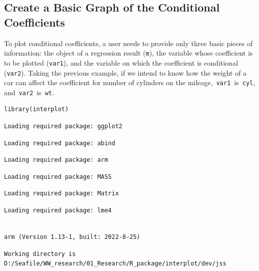 \documentclass[
  article]{jss}
\begin{document}
\hypertarget{create-a-basic-graph-of-the-conditional-coefficients}{%
\subsection{Create a Basic Graph of the Conditional
Coefficients}\label{create-a-basic-graph-of-the-conditional-coefficients}}

To plot conditional coefficients, a user needs to provide only three
basic pieces of information: the object of a regression result
(\texttt{m}), the variable whose coefficient is to be plotted
(\texttt{var1}), and the variable on which the coefficient is
conditional (\texttt{var2}). Taking the previous example, if we intend
to know how the weight of a car can affect the coefficient for number of
cylinders on the mileage,~\texttt{var1}~is~\texttt{cyl},
and~\texttt{var2}~is~\texttt{wt}.

\begin{verbatim}
library(interplot)
\end{verbatim}

\begin{verbatim}
Loading required package: ggplot2
\end{verbatim}

\begin{verbatim}
Loading required package: abind
\end{verbatim}

\begin{verbatim}
Loading required package: arm
\end{verbatim}

\begin{verbatim}
Loading required package: MASS
\end{verbatim}

\begin{verbatim}
Loading required package: Matrix
\end{verbatim}

\begin{verbatim}
Loading required package: lme4
\end{verbatim}

\begin{verbatim}

arm (Version 1.13-1, built: 2022-8-25)
\end{verbatim}

\begin{verbatim}
Working directory is D:/Seafile/WW_research/01_Research/R_package/interplot/dev/jss
\end{verbatim}
\end{document}
